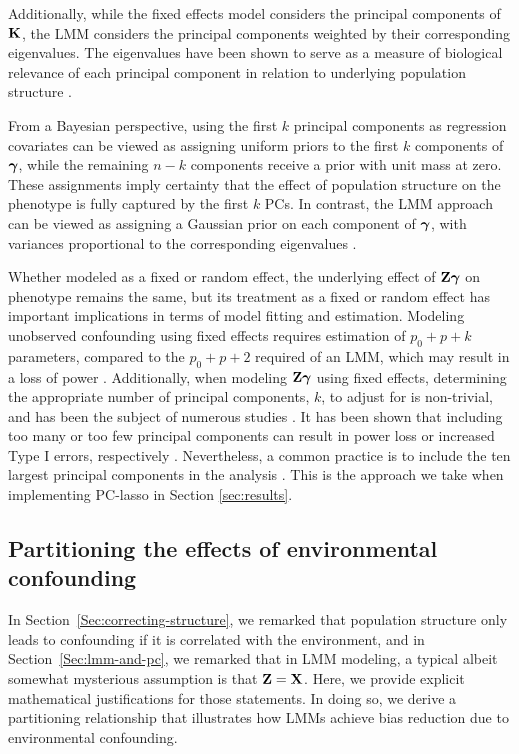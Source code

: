 Additionally, while the fixed effects model considers the principal components of $\mathbf{K}$, the LMM considers the principal components weighted by their corresponding eigenvalues. The eigenvalues have been shown to serve as a measure of biological relevance of each principal component in relation to underlying population structure \citep{hoffman2013correcting, price2006principal}. 

From a Bayesian perspective, using the first $k$ principal components as regression covariates can be viewed as assigning uniform priors to the first $k$ components of $\boldsymbol{\gamma}$, while the remaining $n - k$ components receive a prior with unit mass at zero. These assignments imply certainty that the effect of population structure on the phenotype is fully captured by the first $k$ PCs. In contrast, the LMM approach can be viewed as assigning a Gaussian prior on each component of $\boldsymbol{\gamma}$, with variances proportional to the corresponding eigenvalues \citep{astle2009population}. 

Whether modeled as a fixed or random effect, the underlying effect of $\mathbf{Z} \boldsymbol{\gamma}$ on phenotype remains the same, but its treatment as a fixed or random effect has important implications in terms of model fitting and estimation. Modeling unobserved confounding using fixed effects requires estimation of $p_0 + p + k$ parameters, compared to the $p_0 + p + 2$ required of an LMM, which may result in a loss of power \citep{zhang2015principal}. Additionally, when modeling $\mathbf{Z} \boldsymbol{\gamma}$ using fixed effects, determining the appropriate number of principal components, $k$, to adjust for is non-trivial, and has been the subject of numerous studies \citep{patterson2006population, zhao2018practical}. It has been shown that including too many or too few principal components can result in power loss or increased Type I errors, respectively \citep{zhang2015principal}. Nevertheless, a common practice is to include the ten largest principal components in the analysis \citep{zhao2018practical}. This is the approach we take when implementing PC-lasso in Section \ref{sec:results}.


\subsection{Partitioning the effects of environmental confounding}
\label{sec:partition}

In Section~\ref{Sec:correcting-structure}, we remarked that population structure only leads to confounding if it is correlated with the
environment, and in Section~\ref{Sec:lmm-and-pc}, we remarked that in LMM modeling, a typical albeit somewhat mysterious assumption is that $\mathbf{Z}=\mathbf{X}$.  Here, we provide explicit mathematical justifications for those statements.  In doing so, we derive a partitioning relationship that illustrates how LMMs achieve bias reduction due to environmental confounding.

